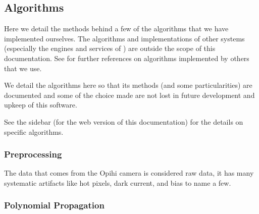 \documentclass[letterpaper,11pt,english]{sphinxmanual}
\begin{document}
\sphinxstepscope


\subsection{Algorithms}
\label{\detokenize{technical/algorithms/index:algorithms}}\label{\detokenize{technical/algorithms/index::doc}}
\sphinxAtStartPar
Here we detail the methods behind a few of the algorithms that we have
implemented ourselves. The algorithms and implementations of other systems
(especially the engines and services of
{\hyperref[\detokenize{technical/architecture/services_engines:technical-architecture-services-engines}]{}}) are outside the scope of this
documentation. See {\hyperref[\detokenize{user/citations:user-citations}]{}} for further references on algorithms
implemented by others that we use.

\sphinxAtStartPar
We detail the algorithms here so that its methods (and some particularities)
are documented and some of the choice made are not lost in future development
and upkeep of this software.

\sphinxAtStartPar
See the sidebar (for the web version of this documentation) for the details on
specific algorithms.

\sphinxstepscope


\subsubsection{Preprocessing}
\label{\detokenize{technical/algorithms/preprocessing:preprocessing}}\label{\detokenize{technical/algorithms/preprocessing:technical-algorithms-preprocessing}}\label{\detokenize{technical/algorithms/preprocessing::doc}}
\sphinxAtStartPar
The data that comes from the Opihi camera is considered raw data, it has many
systematic artifacts like hot pixels, dark current, and bias to name a few.

\sphinxstepscope


\subsubsection{Polynomial Propagation}
\label{\detokenize{technical/algorithms/polynomial_propagation:polynomial-propagation}}\label{\detokenize{technical/algorithms/polynomial_propagation:technical-algorithms-polynomial-propagation}}\label{\detokenize{technical/algorithms/polynomial_propagation::doc}}
\sphinxstepscope
\end{document}
